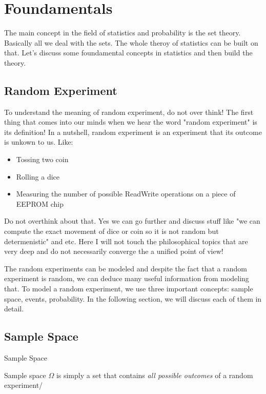 \section{Foundamentals}

The main concept in the field of statistics and probability is the set theory. Basically all we deal with the sets. The whole theroy of statistics can be built on that. Let's discuss some foundamental concepts in statistics and then build the theory.

\subsection{Random Experiment}
To understand the meaning of random experiment, do not over think! The first thing that comes into our minds when we hear the word "random experiment" is its definition! In a nutshell, random experiment is an experiment that its outcome is unkown to us. Like:

\begin{itemize}
\item Tossing two coin
\item Rolling a dice
\item Measuring the number of possible ReadWrite operations on a piece of EEPROM chip
\end{itemize}

Do not overthink about that. Yes we can go further and discuss stuff like "we can compute the exact movement of dice or coin so it is not random but determenistic" and etc. Here I will not touch the philosophical topics that are very deep and do not necessarily converge the a unified point of view!

The random experiments can be modeled and despite the fact that a random experiment is random, we can deduce many useful information from modeling that. To model a random experiment, we use three important concepts: sample space, events, probability. In the following section, we will discuss each of them in detail.


\subsection{Sample Space}

\begin{defbox}{Sample Space}

Sample space $\Omega$ is simply a set that contains \emph{all possible outcomes} of a random experiment/

\end{defbox}


